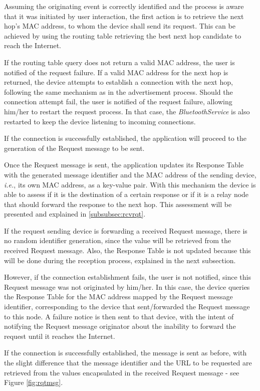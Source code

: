 Assuming the originating event is correctly identified and the process is aware that it was initiated by user interaction, the first action is to retrieve the next hop's \gls{MAC} address, to whom the device shall send its request. This can be achieved by using the routing table retrieving the best next hop candidate to reach the Internet.

If the routing table query does not return a valid \gls{MAC} address, the user is notified of the request failure. If a valid \gls{MAC} address for the next hop is returned, the device attempts to establish a connection with the next hop, following the same mechanism as in the advertisement process. Should the connection attempt fail, the user is notified of the request failure, allowing him/her to restart the request process. In that case, the \textit{BluetoothService} is also restarted to keep the device listening to incoming connections.

If the connection is successfully established, the application will proceed to the generation of the Request message to be sent.

Once the Request message is sent, the application updates its Response Table with the generated message identifier and the \gls{MAC} address of the sending device, \textit{i.e.}, its own \gls{MAC} address, as a key-value pair. With this mechanism the device is able to assess if it is the destination of a certain response or if it is a relay node that should forward the response to the next hop. This assessment will be presented and explained in \ref{subsubsec:rcvrqt}.

If the request sending device is forwarding a received Request message, there is no random identifier generation, since the value will be retrieved from the received Request message. Also, the Response Table is not updated because this will be done during the reception process, explained in the next subsection.

However, if the connection establishment fails, the user is not notified, since this Request message was not originated by him/her. In this case, the device queries the Response Table for the \gls{MAC} address mapped by the Request message identifier, corresponding to the device that sent/forwarded the Request message to this node. A failure notice is then sent to that device, with the intent of notifying the Request message originator about the inability to forward the request until it reaches the Internet.

If the connection is successfully established, the message is sent as before, with the slight difference that the message identifier and the \gls{URL} to be requested are retrieved from the values encapsulated in the received Request message - see Figure \ref{fig:rqtmsg}.

